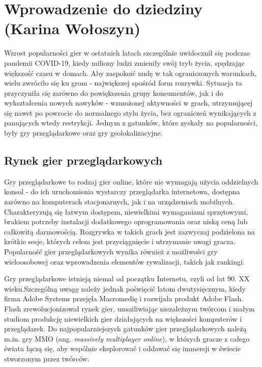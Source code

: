 \chapter{Wprowadzenie do dziedziny (Karina Wołoszyn)}
\label{chap:field}

Wzrost popularności gier w ostatnich latach szczególnie uwidocznił się podczas pandemii COVID-19, kiedy miliony ludzi zmieniły swój tryb życia, spędzając większość czasu w domach. Aby zaspokoić nudę w tak ograniczonych warunkach, wielu zwróciło się ku grom - największej spośród form rozrywki. Sytuacja ta przyczyniła się zarówno do powiększenia grupy konsumentów, jak i do wykształcenia nowych nawyków - wzmożonej aktywności w grach, utrzymującej się nawet po powrocie do normalnego stylu życia, bez ograniczeń wynikających z panujących wtedy restrykcji. Jednym z gatunków, które zyskały na popularności, były gry przeglądarkowe oraz gry geolokalizacyjne.

\section{Rynek gier przeglądarkowych}

Gry przeglądarkowe to rodzaj gier online, które nie wymagają użycia oddzielnych konsol - do ich uruchomienia wystarczy przeglądarka internetowa, dostępna zarówno na komputerach stacjonarnych, jak i na urządzeniach mobilnych. Charakteryzują się łatwym dostępem, niewielkimi wymaganiami sprzętowymi, brakiem potrzeby instalacji dodatkowego oprogramowania oraz niską ceną lub całkowitą darmowością. Rozgrywka w takich grach jest zazwyczaj podzielona na krótkie sesje, których celem jest przyciągnięcie i utrzymanie uwagi gracza. Popularność gier przeglądarkowych wynika również z możliwości gry wieloosobowej oraz wprowadzenia elementów rywalizacji, takich jak rankingi.

Gry przeglądarkowe istnieją niemal od początku Internetu, czyli od lat 90. XX wieku.Szczególną uwagę należy jednak poświęcić latom dwutysięcznym, kiedy firma Adobe Systems przejęła Macromedię i rozwijała produkt Adobe Flash. Flash zrewolucjonizował rynek gier, umożliwiając niezależnym twórcom i małym studiom produkcję niewielkich gier działających na większości komputerów i przeglądarek. Do najpopularniejszych gatunków gier przeglądarkowych należą m.in. gry MMO (ang. \textit{massively multiplayer online}), w których gracze z całego świata łączą się, aby wspólnie eksplorować i oddawać się immersji w świecie stworzonym przez twórców.

